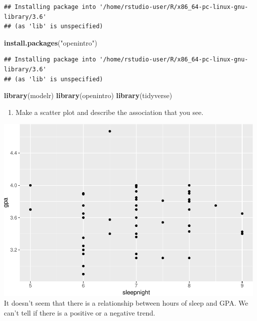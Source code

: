 \documentclass[]{article}
\newenvironment{Shaded}{\begin{snugshade}}{\end{snugshade}}
\newcommand{\DataTypeTok}[1]{\textcolor[rgb]{0.13,0.29,0.53}{#1}}
\newcommand{\KeywordTok}[1]{\textcolor[rgb]{0.13,0.29,0.53}{\textbf{#1}}}
\newcommand{\NormalTok}[1]{#1}
\newcommand{\OperatorTok}[1]{\textcolor[rgb]{0.81,0.36,0.00}{\textbf{#1}}}
\newcommand{\StringTok}[1]{\textcolor[rgb]{0.31,0.60,0.02}{#1}}
\providecommand{\tightlist}{%
  \setlength{\itemsep}{0pt}\setlength{\parskip}{0pt}}
\begin{document}
\begin{verbatim}
## Installing package into '/home/rstudio-user/R/x86_64-pc-linux-gnu-library/3.6'
## (as 'lib' is unspecified)
\end{verbatim}

\begin{Shaded}
\begin{Highlighting}[]
\KeywordTok{install.packages}\NormalTok{(}\StringTok{"openintro"}\NormalTok{)}
\end{Highlighting}
\end{Shaded}

\begin{verbatim}
## Installing package into '/home/rstudio-user/R/x86_64-pc-linux-gnu-library/3.6'
## (as 'lib' is unspecified)
\end{verbatim}

\begin{Shaded}
\begin{Highlighting}[]
\KeywordTok{library}\NormalTok{(modelr)}
\KeywordTok{library}\NormalTok{(openintro)}
\KeywordTok{library}\NormalTok{(tidyverse)}
\end{Highlighting}
\end{Shaded}

\begin{enumerate}
\def\labelenumi{\arabic{enumi}.}
\setcounter{enumi}{1}
\tightlist
\item
  Make a scatter plot and describe the association that you see.
\end{enumerate}

\begin{Shaded}
\end{Shaded}

\includegraphics{lab-8-regression_files/figure-latex/unnamed-chunk-4-1.pdf}
It doesn't seem that there is a relationship between hours of sleep and
GPA. We can't tell if there is a positive or a negative trend.
\end{document}
